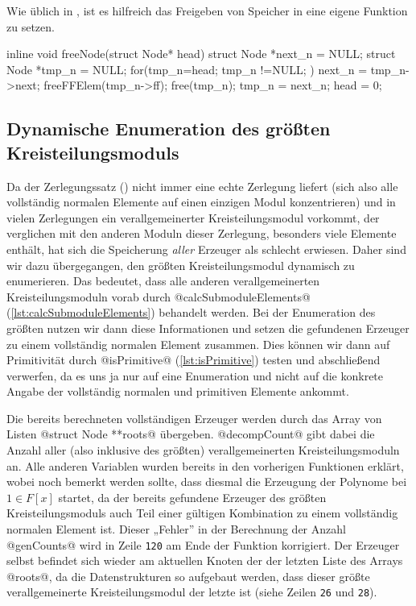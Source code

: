 Wie üblich in \Clang, ist es hilfreich das Freigeben von Speicher in eine 
eigene Funktion zu setzen.

\begin{ccode}[caption={Aus \url{../Sage/enumeratePCNs.c}},
  label=lst:freeNode]
inline void freeNode(struct Node* head){
    struct Node *next_n = NULL;
    struct Node *tmp_n = NULL;
    for(tmp_n=head; tmp_n !=NULL; ){
        next_n = tmp_n->next;
        freeFFElem(tmp_n->ff);
        free(tmp_n);
        tmp_n = next_n;
    }
    head = 0;
}
\end{ccode}

\subsection{Dynamische Enumeration des größten Kreisteilungsmoduls}
\label{sub:dynamische_enumeration}

Da der Zerlegungssatz () nicht immer eine echte
Zerlegung liefert (sich also alle vollständig normalen Elemente auf einen
einzigen Modul konzentrieren) und in vielen Zerlegungen ein verallgemeinerter
Kreisteilungsmodul vorkommt, der verglichen mit den anderen Moduln dieser
Zerlegung, besonders viele Elemente enthält, hat sich die Speicherung
\emph{aller} Erzeuger als schlecht erwiesen. Daher sind wir dazu übergegangen,
den größten Kreisteilungsmodul dynamisch zu enumerieren. Das bedeutet, dass
alle anderen verallgemeinerten Kreisteilungsmoduln vorab durch 
@calcSubmoduleElements@ (\autoref{lst:calcSubmoduleElements}) behandelt werden.
Bei der Enumeration des größten nutzen wir dann diese Informationen und setzen
die gefundenen Erzeuger zu einem vollständig normalen Element zusammen. Dies
können wir dann auf Primitivität durch @isPrimitive@
(\autoref{lst:isPrimitive}) testen und abschließend verwerfen, da es uns ja nur
auf eine Enumeration und nicht auf die konkrete Angabe der vollständig normalen
und primitiven Elemente ankommt.

Die bereits berechneten vollständigen Erzeuger werden durch 
das Array von Listen @struct Node **roots@ übergeben. @decompCount@ gibt dabei
die Anzahl aller (also inklusive des größten) verallgemeinerten
Kreisteilungsmoduln an. Alle anderen Variablen wurden bereits in den vorherigen
Funktionen erklärt, wobei noch bemerkt werden sollte, dass diesmal die
Erzeugung der Polynome bei $1 \in F[x]$ startet, da der bereits gefundene
Erzeuger des größten Kreisteilungsmoduls auch Teil einer gültigen Kombination
zu einem vollständig normalen Element ist. Dieser „Fehler” in der Berechnung
der Anzahl @genCounts@ wird in Zeile \texttt{120} am Ende der Funktion
korrigiert. Der Erzeuger selbst befindet sich wieder am aktuellen Knoten der
der letzten Liste des Arrays @roots@, da die Datenstrukturen so
aufgebaut werden, dass dieser größte verallgemeinerte Kreisteilungsmodul der
letzte ist (siehe Zeilen \texttt{26} und \texttt{28}).


